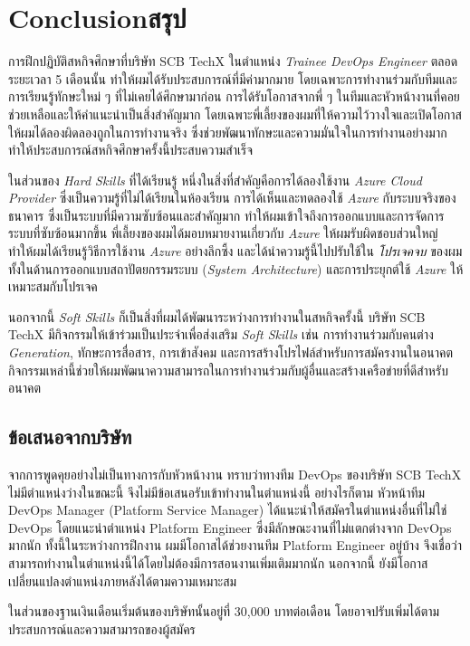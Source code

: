 \chapter{\ifenglish Conclusion\else สรุป\fi}

การฝึกปฏิบัติสหกิจศึกษาที่บริษัท SCB TechX ในตำแหน่ง \textit{Trainee DevOps Engineer} ตลอดระยะเวลา 5 เดือนนั้น ทำให้ผมได้รับประสบการณ์ที่มีค่ามากมาย โดยเฉพาะการทำงานร่วมกับทีมและการเรียนรู้ทักษะใหม่ ๆ ที่ไม่เคยได้ศึกษามาก่อน การได้รับโอกาสจากพี่ ๆ ในทีมและหัวหน้างานที่คอยช่วยเหลือและให้คำแนะนำเป็นสิ่งสำคัญมาก โดยเฉพาะพี่เลี้ยงของผมที่ให้ความไว้วางใจและเปิดโอกาสให้ผมได้ลองผิดลองถูกในการทำงานจริง ซึ่งช่วยพัฒนาทักษะและความมั่นใจในการทำงานอย่างมาก ทำให้ประสบการณ์สหกิจศึกษาครั้งนี้ประสบความสำเร็จ

ในส่วนของ \textit{Hard Skills} ที่ได้เรียนรู้ หนึ่งในสิ่งที่สำคัญคือการได้ลองใช้งาน \textit{Azure Cloud Provider} ซึ่งเป็นความรู้ที่ไม่ได้เรียนในห้องเรียน การได้เห็นและทดลองใช้ \textit{Azure} กับระบบจริงของธนาคาร ซึ่งเป็นระบบที่มีความซับซ้อนและสำคัญมาก ทำให้ผมเข้าใจถึงการออกแบบและการจัดการระบบที่ซับซ้อนมากขึ้น พี่เลี้ยงของผมได้มอบหมายงานเกี่ยวกับ \textit{Azure} ให้ผมรับผิดชอบส่วนใหญ่ ทำให้ผมได้เรียนรู้วิธีการใช้งาน \textit{Azure} อย่างลึกซึ้ง และได้นำความรู้นี้ไปปรับใช้ใน \textit{โปรเจคจบ} ของผม ทั้งในด้านการออกแบบสถาปัตยกรรมระบบ (\textit{System Architecture}) และการประยุกต์ใช้ \textit{Azure} ให้เหมาะสมกับโปรเจค

นอกจากนี้ \textit{Soft Skills} ก็เป็นสิ่งที่ผมได้พัฒนาระหว่างการทำงานในสหกิจครั้งนี้ บริษัท SCB TechX มีกิจกรรมให้เข้าร่วมเป็นประจำเพื่อส่งเสริม \textit{Soft Skills} เช่น การทำงานร่วมกับคนต่าง \textit{Generation}, ทักษะการสื่อสาร, การเข้าสังคม และการสร้างโปรไฟล์สำหรับการสมัครงานในอนาคต กิจกรรมเหล่านี้ช่วยให้ผมพัฒนาความสามารถในการทำงานร่วมกับผู้อื่นและสร้างเครือข่ายที่ดีสำหรับอนาคต

\section{ข้อเสนอจากบริษัท}
จากการพูดคุยอย่างไม่เป็นทางการกับหัวหน้างาน ทราบว่าทางทีม DevOps ของบริษัท SCB TechX ไม่มีตำแหน่งว่างในขณะนี้ จึงไม่มีข้อเสนอรับเข้าทำงานในตำแหน่งนี้ อย่างไรก็ตาม หัวหน้าทีม DevOps Manager (Platform Service Manager) ได้แนะนำให้สมัครในตำแหน่งอื่นที่ไม่ใช่ DevOps โดยแนะนำตำแหน่ง Platform Engineer ซึ่งมีลักษณะงานที่ไม่แตกต่างจาก DevOps มากนัก ทั้งนี้ในระหว่างการฝึกงาน ผมมีโอกาสได้ช่วยงานทีม Platform Engineer อยู่บ้าง จึงเชื่อว่าสามารถทำงานในตำแหน่งนี้ได้โดยไม่ต้องมีการสอนงานเพิ่มเติมมากนัก นอกจากนี้ ยังมีโอกาสเปลี่ยนแปลงตำแหน่งภายหลังได้ตามความเหมาะสม

ในส่วนของฐานเงินเดือนเริ่มต้นของบริษัทนั้นอยู่ที่ 30,000 บาทต่อเดือน โดยอาจปรับเพิ่มได้ตามประสบการณ์และความสามารถของผู้สมัคร
